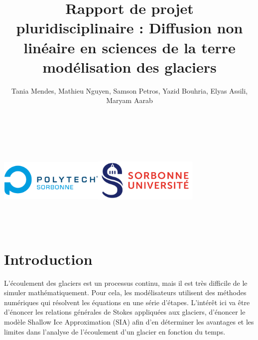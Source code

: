 \documentclass{article}
\begin{document}
\title{\textbf{Rapport de projet pluridisciplinaire :} \newline Diffusion non linéaire en sciences de la terre modélisation des glaciers}
\author{Tania Mendes, Mathieu Nguyen, Samson Petros, Yazid Bouhria, Elyas Assili, Maryam Aarab}
\maketitle
 
\vspace{50 mm}
\includegraphics[width=5cm, keepaspectratio=true, height=5cm]{Logo_Polytech_Sorbonne-2.png}\hfill\includegraphics[width=5cm, keepaspectratio=true, height=5cm]{Logo_Sorbonne_Universite-2.png}



\author{} 


\newpage

\tableofcontents

\newpage
\section{Introduction}\label{sec:intro}

L’écoulement des glaciers est un processus continu, mais il est très difficile de le simuler mathématiquement. Pour cela, les modélisateurs utilisent des méthodes numériques qui résolvent les équations en une série d’étapes.
L’intérêt ici va être d’énoncer les relations générales de Stokes appliquées aux glaciers, d’énoncer le modèle Shallow Ice Approximation (SIA) afin d’en déterminer les avantages et les limites dans l’analyse de l’écoulement d’un glacier en fonction du temps.
\end{document}
